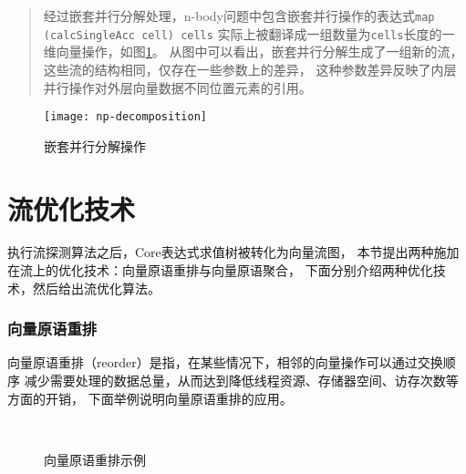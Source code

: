 \begin{quotation}
  经过嵌套并行分解处理，n-body问题中包含嵌套并行操作的表达式\texttt{map (calcSingleAcc cell) cells}
  实际上被翻译成一组数量为\texttt{cells}长度的一维向量操作，如图\ref{fig:np-decomposition}。
  从图中可以看出，嵌套并行分解生成了一组新的流，这些流的结构相同，仅存在一些参数上的差异，
  这种参数差异反映了内层并行操作对外层向量数据不同位置元素的引用。
\end{quotation}
\begin{figure}
  \centering
  \texttt{[image: np-decomposition]}
  \caption{嵌套并行分解操作}
  \label{fig:np-decomposition}
\end{figure}

\section{流优化技术}\label{sec:stream-optimization}
执行流探测算法之后，Core表达式求值树被转化为向量流图，
本节提出两种施加在流上的优化技术：向量原语重排与向量原语聚合，
下面分别介绍两种优化技术，然后给出流优化算法。

\subsubsection{向量原语重排}
向量原语重排（reorder）是指，在某些情况下，相邻的向量操作可以通过交换顺序
减少需要处理的数据总量，从而达到降低线程资源、存储器空间、访存次数等方面的开销，
下面举例说明向量原语重排的应用。
\begin{quotation}
\end{quotation}
\begin{figure}
  \centering
  \\
  \caption{向量原语重排示例}
  \label{fig:vp-reorder}
\end{figure}

